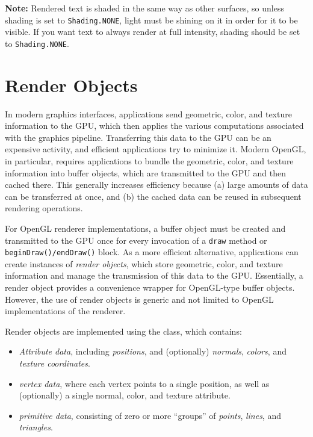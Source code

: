 \begin{sideblock}
{\bf Note:} Rendered text is shaded in the same way as other surfaces,
so unless shading is set to {\tt Shading.NONE}, light must be shining
on it in order for it to be visible. If you want text to always render
at full intensity, shading should be set to {\tt Shading.NONE}.
\end{sideblock}

\section{Render Objects}
\label{renderObjects:sec}

In modern graphics interfaces, applications send geometric, color,
and texture information to the GPU, which then applies the various
computations associated with the graphics pipeline. Transferring this
data to the GPU can be an expensive activity, and efficient applications
try to minimize it. Modern OpenGL, in particular, requires
applications to bundle the geometric, color, and texture information
into buffer objects, which are transmitted to the GPU and then cached
there.  This generally increases efficiency because (a) large amounts
of data can be transferred at once, and (b) the cached data can be
reused in subsequent rendering operations.

For OpenGL renderer implementations, a buffer object must be created
and transmitted to the GPU once for every invocation of a {\tt draw}
method or {\tt beginDraw()/endDraw()} block. As a more efficient
alternative, applications can create instances of {\it render
objects}, which store geometric, color, and texture information and
manage the transmission of this data to the GPU. Essentially, a render
object provides a convenience wrapper for OpenGL-type buffer objects.
However, the use of render objects is generic and not limited to
OpenGL implementations of the renderer.

Render objects are implemented using the
 class, which
contains:

\begin{itemize}

\item {\it Attribute data}, including {\it positions}, and
(optionally) {\it normals}, {\it colors}, and {\it texture
coordinates}.

\item {\it vertex data}, where each vertex points to a single
position, as well as (optionally) a single normal, color, and texture
attribute.

\item {\it primitive data}, consisting of zero or more ``groups'' of
{\it points}, {\it lines}, and {\it triangles}.

\end{itemize}

